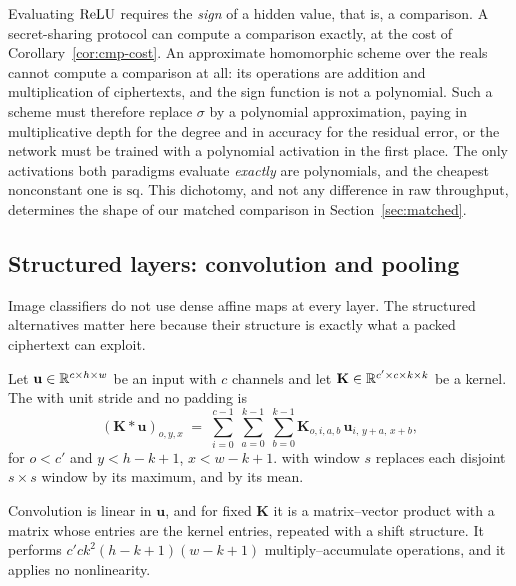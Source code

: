 \begin{remark}
\label{rem:activation-dichotomy}
Evaluating $\mathrm{ReLU}$ requires the \emph{sign} of a hidden value, that is, a
comparison. A secret-sharing protocol can compute a comparison exactly, at the
cost of Corollary~\ref{cor:cmp-cost}. An approximate homomorphic scheme over the
reals cannot compute a comparison at all: its operations are addition and
multiplication of ciphertexts, and the sign function is not a polynomial. Such a
scheme must therefore replace $\sigma$ by a polynomial approximation, paying in
multiplicative depth for the degree and in accuracy for the residual error, or the
network must be trained with a polynomial activation in the first place. The only
activations both paradigms evaluate \emph{exactly} are polynomials, and the
cheapest nonconstant one is $\mathrm{sq}$. This dichotomy, and not any difference
in raw throughput, determines the shape of our matched comparison in
Section~\ref{sec:matched}.
\end{remark}

\subsection{Structured layers: convolution and pooling}
\label{sec:ml:conv}

Image classifiers do not use dense affine maps at every layer. The structured
alternatives matter here because their structure is exactly what a packed
ciphertext can exploit.

\begin{definition}
\label{def:conv}
Let $\mathbf{u} \in \mathbb{R}^{c \times h \times w}$ be an input with $c$ channels and
let $\mathbf{K} \in \mathbb{R}^{c' \times c \times k \times k}$ be a kernel. The
 with unit stride and no padding is
\[
  (\mathbf{K} * \mathbf{u})_{o,y,x} \;=\;
  \sum_{i=0}^{c-1}\ \sum_{a=0}^{k-1}\ \sum_{b=0}^{k-1}
  \mathbf{K}_{o,i,a,b}\, \mathbf{u}_{i,\,y+a,\,x+b} ,
\]
for $o < c'$ and $y < h-k+1$, $x < w-k+1$.  with window $s$
replaces each disjoint $s \times s$ window by its maximum, and  by its mean.
\end{definition}

\begin{proposition}
\label{prop:conv-linear}
Convolution is linear in $\mathbf{u}$, and for fixed $\mathbf{K}$ it is a
matrix--vector product with a matrix whose entries are the kernel entries,
repeated with a shift structure. It performs $c'c k^2 (h-k+1)(w-k+1)$
multiply--accumulate operations, and it applies no nonlinearity.
\end{proposition}

